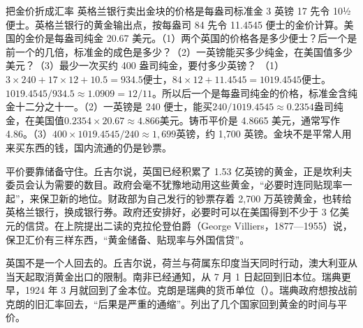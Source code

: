 \begin{example}{把金价折成汇率}\label{ex:interwar-parity}
英格兰银行卖出金块的价格是每盎司标准金 3 英镑 17 先令 10½ 便士\cite{gsa1925}。英格兰银行的黄金输出点，按每盎司 84 先令 11.4545 便士的金价计算\cite{brown1940}。美国的金价是每盎司纯金 20.67 美元\cite{nurkse1944}。（1）两个英国的价格各是多少便士？后一个是前一个的几倍，标准金的成色是多少？（2）一英镑能买多少纯金，在美国值多少美元？（3）最少一次买约 400 盎司纯金，要付多少英镑？
\solution （1）$3\times240+17\times12+10.5=934.5$便士，$84\times12+11.4545=1019.4545$便士。$1019.4545/934.5\approx1.0909=12/11$。所以后一个是每盎司纯金的价格，标准金含纯金十二分之十一。（2）一英镑是 240 便士，能买$240/1019.4545\approx0.2354$盎司纯金，在美国值$0.2354\times20.67\approx4.866$美元。铸币平价是 4.8665 美元\cite{brown1940}，通常写作 4.86。（3）$400\times1019.4545/240\approx1{,}699$英镑，约 1,700 英镑。金块不是平常人用来买东西的钱，国内流通的仍是钞票。
\end{example}

平价要靠储备守住。丘吉尔说，英国已经积累了 1.53 亿英镑的黄金，正是坎利夫委员会认为需要的数目\cite{hansard1925}。政府会毫不犹豫地动用这些黄金，“必要时连同贴现率一起”，来保卫新的地位\cite{hansard1925}。财政部为自己发行的钞票存着 2,700 万英镑黄金，也转给英格兰银行，换成银行券\cite{hansard1925}。政府还安排好，必要时可以在美国得到不少于 3 亿美元的信贷\cite{hansard1925}。在上院提出二读的克拉伦登伯爵（George Villiers，1877—1955）说，保卫汇价有三样东西，“黄金储备、贴现率与外国信贷”\cite{hansardlords1925,hansardpeople27}。

英国不是一个人回去的。丘吉尔说，荷兰与荷属东印度当天同时行动，澳大利亚从当天起取消黄金出口的限制\cite{hansard1925}。南非已经通知，从 7 月 1 日起回到旧本位\cite{hansard1925}。瑞典更早，1924 年 3 月就回到了金本位\cite{brown1940}。克朗是瑞典的货币单位（）。瑞典政府想按战前克朗的旧汇率回去，“后果是严重的通缩”\cite{riksbank2026c}。列出了几个国家回到黄金的时间与平价。


